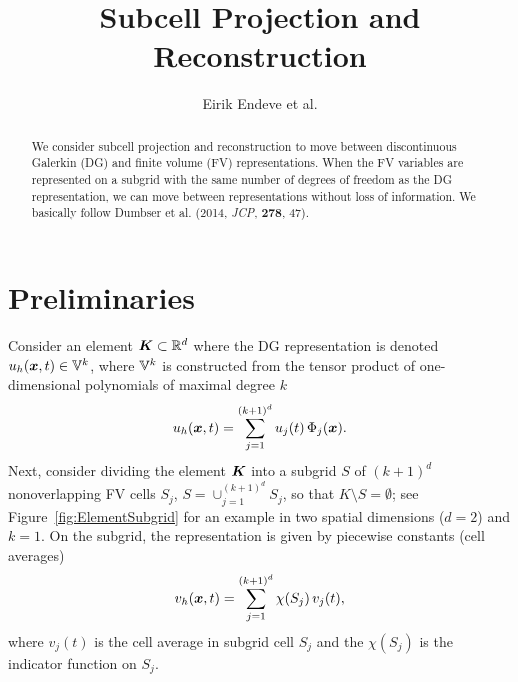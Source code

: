 \documentclass[10pt]{article}
\begin{document}
\title{Subcell Projection and Reconstruction}
\author{Eirik Endeve et al.}

\maketitle

\begin{abstract}
  We consider subcell projection and reconstruction to move between discontinuous Galerkin (DG) and finite volume (FV) representations.  
  When the FV variables are represented on a subgrid with the same number of degrees of freedom as the DG representation, we can move between representations without loss of information.  
  We basically follow Dumbser et al. (2014, {\it JCP}, {\bf 278}, 47).  
\end{abstract}

\tableofcontents

\section{Preliminaries}

Consider an element $\boldsymbol{K}\subset\mathbb{R}^{d}$ where the DG representation is denoted $u_{h}(\boldsymbol{x},t)\in\mathbb{V}^{k}$, where $\mathbb{V}^{k}$ is constructed from the tensor product of one-dimensional polynomials of maximal degree $k$
\begin{equation}
  u_{h}(\boldsymbol{x},t)=\sum_{j=1}^{(k+1)^{d}}u_{j}(t)\,\Phi_{j}(\boldsymbol{x}).
  \label{eq:dgRepresentation}
\end{equation}
Next, consider dividing the element $\boldsymbol{K}$ into a subgrid $S$ of $(k+1)^{d}$ nonoverlapping FV cells $S_{j}$, $S=\cup_{j=1}^{(k+1)^{d}} S_{j}$, so that $K\setminus S=\emptyset$; see Figure~\ref{fig:ElementSubgrid} for an example in two spatial dimensions ($d=2$) and $k=1$.  
On the subgrid, the representation is given by piecewise constants (cell averages)
\begin{equation}
  v_{h}(\boldsymbol{x},t)=\sum_{j=1}^{(k+1)^{d}}\chi(S_{j})\,v_{j}(t),
  \label{eq:piecewiseConstants}
\end{equation}
where $v_{j}(t)$ is the cell average in subgrid cell $S_{j}$ and the $\chi(S_{j})$ is the indicator function on $S_{j}$.  
\end{document}
